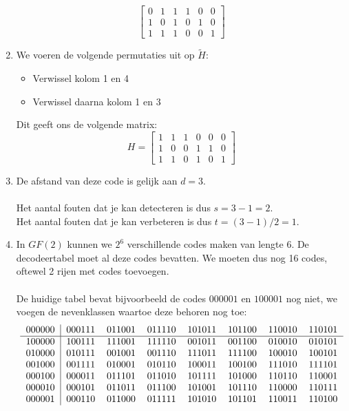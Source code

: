 \documentclass[11pt,a4paper,titlepage]{article}
\begin{document}
\begin{enumerate}[label=(\alph*)]
$$ \begin{bmatrix}
 0  & 1 & 1 &1 & 0 & 0 \\
 1 & 0 & 1 &0 & 1 & 0 \\
1 & 1 & 1 &0 & 0 & 1
 \end{bmatrix}$$
	\item We voeren de volgende permutaties uit op $\tilde{H}$:
		\begin{itemize}	
			\item Verwissel kolom 1 en 4
			\item Verwissel daarna kolom 1 en 3
		\end{itemize}
		Dit geeft ons de volgende matrix:
			$$ H = 
 \begin{bmatrix}
 1  & 1 & 1 & 0& 0 & 0 \\
 1 & 0 & 0 &1 & 1 & 0 \\
 1 & 1 & 0 &1 & 0 & 1
 \end{bmatrix}$$
	\item De afstand van deze code is gelijk aan $d = 3$. \\ \\
		Het aantal fouten dat je kan detecteren is dus $s = 3 - 1 = 2$.\\
		Het aantal fouten dat je kan verbeteren is dus $t = (3-1)/2 = 1$.
	\item In $GF(2)$ kunnen we $2^6$ verschillende codes maken van lengte $6$. De decodeertabel moet al deze codes bevatten.
		We moeten dus nog 16 codes, oftewel 2 rijen met codes toevoegen.\\ \\
		De huidige tabel bevat bijvoorbeeld de codes $000001$ en $100001$ nog niet, we voegen de nevenklassen waartoe deze behoren nog toe:
			$$\begin{tabular}{l|lllllll}
000000 & 000111 & 011001 & 011110 & 101011 & 101100 & 110010 & 110101 \\ \hline
100000 & 100111 & 111001 & 111110 & 001011 & 001100 & 010010 & 010101 \\
010000 & 010111 & 001001 & 001110 & 111011 & 111100 & 100010 & 100101 \\
001000 & 001111 & 010001 & 010110 & 100011 & 100100 & 111010 & 111101 \\
000100 & 000011 & 011101 & 011010 & 101111 & 101000 & 110110 & 110001 \\
000010 & 000101 & 011011 & 011100 & 101001 & 101110 & 110000 & 110111 \\
000001 & 000110 & 011000 & 011111 & 101010 & 101101 & 110011 & 110100 \\

\end{tabular}$$
\end{enumerate}
\end{document}
